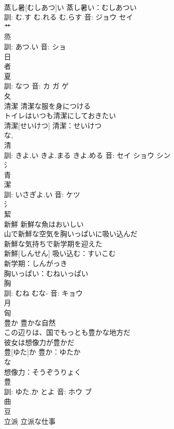 \documentclass[8pt]{extreport}
\begin{document}
\begin{CJK}{UTF8}{min}
\\	蒸し暑[むしあつ]い			蒸し暑い：むしあつい
\\	訓: む.す む.れる む.らす 音: ジョウ セイ 
\\	艹 
\\	烝 
\\	訓: あつ.い 音: ショ 
\\	日 
\\	者 
\\	夏 
\\	訓: なつ 音: カ ガ ゲ 
\\	夂 
\\	清潔	清潔な服を身につける 
\\	トイレはいつも清潔にしておきたい 
\\	清潔[せいけつ]			清潔：せいけつ
\\	な, 
\\	清 
\\	訓: きよ.い きよ.まる きよ.める 音: セイ ショウ シン 
\\	氵 
\\	青 
\\	潔 
\\	訓: いさぎよ.い 音: ケツ 
\\	氵 
\\	絜 
\\	新鮮	新鮮な魚はおいしい 
\\	山で新鮮な空気を胸いっぱいに吸い込んだ 
\\	新鮮な気持ちで新学期を迎えた 
\\	新鮮[しんせん]			吸い込む：すいこむ
\\	新学期：しんがっき
\\	胸いっぱい：むねいっぱい
\\	胸 
\\	訓: むね むな- 音: キョウ 
\\	月 
\\	匈 
\\	豊か	豊かな自然 
\\	この辺りは、国でもっとも豊かな地方だ 
\\	彼女は想像力が豊かだ 
\\	豊[ゆた]か			豊か：ゆたか
\\	な 
\\	想像力：そうぞうりょく
\\	豊 
\\	訓: ゆた.か とよ 音: ホウ ブ 
\\	曲 
\\	豆 
\\	立派	立派な仕事 

\end{CJK}
\end{document}
